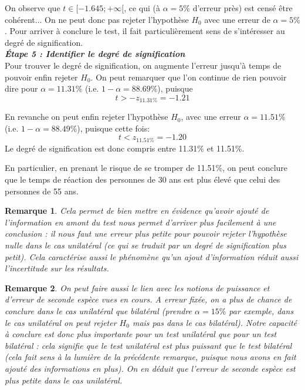 \documentclass[a4paper,oneside,12pt]{article}
\theoremstyle{plain}
\newtheorem*{remark}{Remarque}
\begin{document}
On observe que $t\in [-1.645;+\infty[$, ce qui (à $\alpha = 5\%$ d'erreur près) est censé être cohérent... On ne peut donc pas rejeter l'hypothèse $H_0$ avec une erreur de $\alpha = 5\%$. Pour arriver à conclure le test, il fait particulièrement sens de s'intéresser au degré de signification.\\
    
\textit{\textbf{Étape 5 : Identifier le degré de signification}}\\
Pour trouver le degré de signification, on augmente l'erreur jusqu'à temps de pouvoir enfin rejeter $H_0$. On peut remarquer que l'on continue de rien pouvoir dire pour $\alpha = 11.31\%$ (i.e. $1-\alpha = 88.69\%$), puisque 
$$t> - z_{11.31\%} = -1.21$$

En revanche on peut enfin rejeter l'hypothèse $H_0$, avec une erreur $\alpha = 11.51\%$ (i.e. $1-\alpha = 88.49\%$), puisque cette fois: 
$$t< z_{11.51\%} = -1.20$$
Le degré de signification est donc compris entre 11.31\% et 11.51\%. 
    
En particulier, en prenant le risque de se tromper de 11.51\%, on peut conclure que le temps de réaction des personnes de 30 ans est plus élevé que celui des personnes de 55 ans.


\begin{remark}
Cela permet de bien mettre en évidence qu'avoir ajouté de l'information en amont du test nous permet d'arriver plus facilement à une conclusion : il nous faut une erreur plus petite pour pouvoir rejeter l'hypothèse nulle dans le cas unilatéral (ce qui se traduit par un degré de signification plus petit). Cela caractérise aussi le phénomène qu'un ajout d'information réduit aussi l'incertitude sur les résultats.
\end{remark}

\begin{remark}
On peut faire aussi le lien avec les notions de puissance et d'erreur de seconde espèce vues en cours. A erreur fixée, on a plus de chance de conclure dans le cas unilatéral que bilatéral (prendre $\alpha = 15\%$ par exemple, dans le cas unilatéral on peut rejeter $H_0$ mais pas dans le cas bilatéral). Notre capacité à conclure est donc plus importante pour un test unilatéral que pour un test bilatéral : cela signifie que le test unilatéral est plus puissant que le test bilatéral (cela fait sens à la lumière de la précédente remarque, puisque nous avons en fait ajouté des informations en plus). On en déduit que l'erreur de seconde espèce est plus petite dans le cas unilatéral.
\end{remark}
\end{document}
